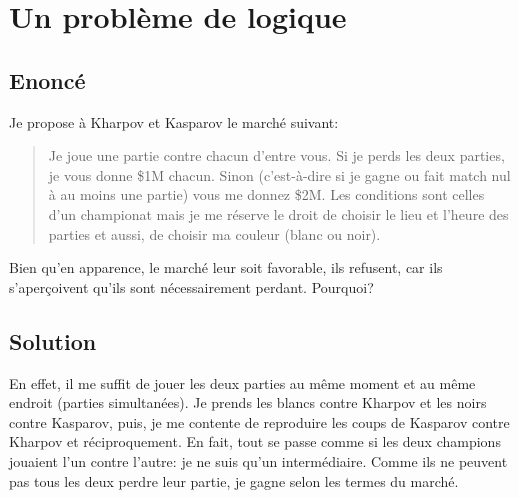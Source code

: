 \documentclass{article}
\newenvironment{statement}{\subsection{Enoncé}}{\pagebreak}
\newenvironment{solution}{\subsection{Solution}}{\pagebreak}
\begin{document}
\section{Un problème de logique}
\begin{statement}
Je propose à Kharpov et Kasparov le marché suivant:
\begin{quote}
Je joue une partie contre chacun d'entre vous. Si je perds les deux parties, je vous donne \$1M chacun. Sinon (c'est-à-dire si je gagne ou fait match nul à au moins une partie) vous me donnez \$2M. Les conditions sont celles d'un championat mais je me réserve le droit de choisir le lieu et l'heure des parties et aussi, de choisir ma couleur (blanc ou noir).
\end{quote}
Bien qu'en apparence, le marché leur soit favorable, ils refusent, car ils s'aperçoivent qu'ils sont
nécessairement perdant. Pourquoi?
\end{statement}
\begin{solution}
En effet, il me suffit de jouer les deux parties au même moment et au même endroit (parties simultanées). Je prends les blancs contre Kharpov et les noirs contre Kasparov, puis, je me contente de reproduire les coups de Kasparov contre Kharpov et réciproquement. En fait, tout se passe comme si les deux champions jouaient l'un contre l'autre: je ne suis qu'un intermédiaire. Comme ils ne peuvent pas tous les deux perdre leur partie, je gagne selon les termes du marché.
\end{solution}

\end{document}
